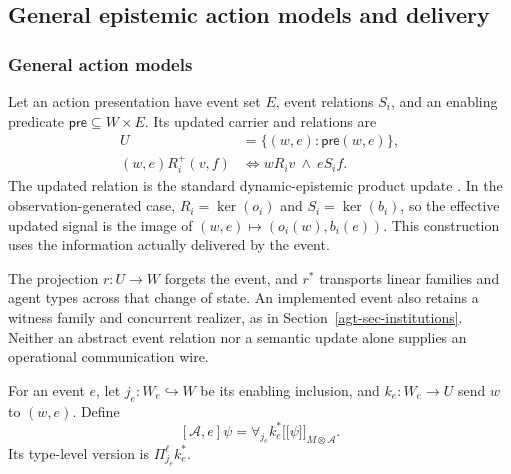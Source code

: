 \documentclass[11pt,a4paper]{article}
\numberwithin{equation}{section}
\theoremstyle{definition}
\theoremstyle{remark}
\theoremstyle{plain}
\providecommand{\llbracket}{\mathopen{[\![}}
\providecommand{\rrbracket}{\mathclose{]\!]}}
\providecommand{\sem}[1]{\llbracket #1\rrbracket}
\providecommand{\kerpair}{\mathop{\mathrm{ker}}}
\begin{document}
\subsection{General epistemic action models and delivery}
\label{agt-sec-actions}

\subsubsection{General action models}

Let an action presentation have event set $E$, event relations $S_i$, and
an enabling predicate $\mathsf{pre}\subseteq W\times E$. Its updated
carrier and relations are
\begin{align}
 U&=\{(w,e):\mathsf{pre}(w,e)\},
 \label{agt-eq-actioncarrier}\\
 (w,e)R_i^+(v,f)&\iff wR_iv\ \wedge\ eS_if.
 \label{agt-eq-actionrelation}
\end{align}
The updated relation is the standard dynamic-epistemic product
update \citep{BaltagMossSolecki1998PublicAnnouncements}. In the
observation-generated case, $R_i=\kerpair(o_i)$ and
$S_i=\kerpair(b_i)$, so the effective updated signal is the image
of $(w,e)\mapsto(o_i(w),b_i(e))$. This construction uses the
information actually delivered by the event.

The projection $r:U\to W$ forgets the event, and $r^*$
transports linear families and agent types across that change of state.
An implemented event also retains a witness family and concurrent
realizer, as in Section~\ref{agt-sec-institutions}. Neither an abstract
event relation nor a semantic update alone supplies an operational
communication wire.

For an event $e$, let $j_e:W_e\hookrightarrow W$ be its enabling inclusion,
and $k_e:W_e\to U$ send $w$ to $(w,e)$. Define
\[
 [\mathcal A,e]\psi=\forall_{j_e}k_e^*\sem\psi_{M\otimes\mathcal A}.
\]
Its type-level version is $\Pi_{j_e}^\ell k_e^*$.
\end{document}
